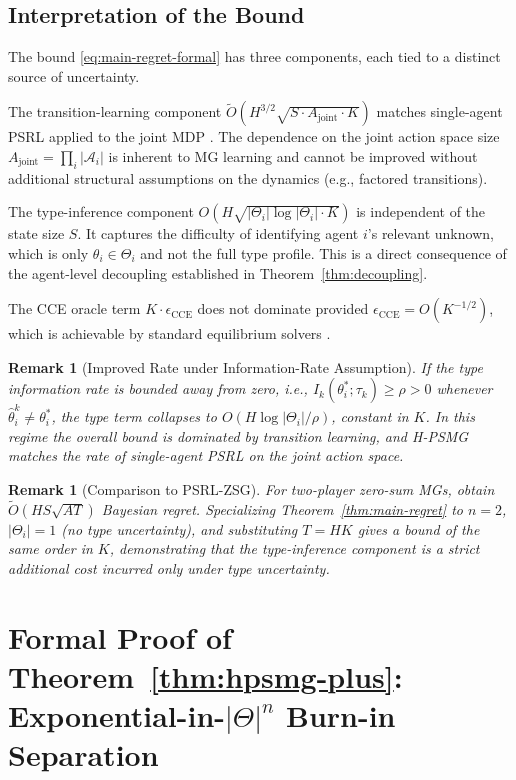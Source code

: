 \documentclass{article}
\newtheorem{remark}[theorem]{Remark}
\begin{document}
\subsection{Interpretation of the Bound}

The bound \eqref{eq:main-regret-formal} has three components, each tied to a distinct source of uncertainty.

The transition-learning component $\tilde{O}(H^{3/2}\sqrt{S \cdot A_{\mathrm{joint}} \cdot K})$ matches single-agent PSRL applied to the joint MDP \citep{osband2013more}. The dependence on the joint action space size $A_{\mathrm{joint}} = \prod_i |\mathcal{A}_i|$ is inherent to MG learning and cannot be improved without additional structural assumptions on the dynamics (e.g., factored transitions).

The type-inference component $O(H\sqrt{|\Theta_i| \log|\Theta_i| \cdot K})$ is independent of the state size $S$. It captures the difficulty of identifying agent $i$'s relevant unknown, which is only $\theta_i \in \Theta_i$ and not the full type profile. This is a direct consequence of the agent-level decoupling established in Theorem~\ref{thm:decoupling}.

The CCE oracle term $K \cdot \epsilon_{\mathrm{CCE}}$ does not dominate provided $\epsilon_{\mathrm{CCE}} = O(K^{-1/2})$, which is achievable by standard equilibrium solvers \citep{jin2021v}.

\begin{remark}[Improved Rate under Information-Rate Assumption]
If the type information rate is bounded away from zero, i.e., $I_k(\theta_i^*; \tau_k) \geq \rho > 0$ whenever $\hat{\theta}_i^k \neq \theta_i^*$, the type term collapses to $O(H \log|\Theta_i| / \rho)$, constant in $K$. In this regime the overall bound is dominated by transition learning, and H-PSMG matches the rate of single-agent PSRL on the joint action space.
\end{remark}

\begin{remark}[Comparison to PSRL-ZSG]
For two-player zero-sum MGs, \citet{jafarnia2021learning} obtain $\tilde{O}(HS\sqrt{AT})$ Bayesian regret. Specializing Theorem~\ref{thm:main-regret} to $n=2$, $|\Theta_i| = 1$ (no type uncertainty), and substituting $T = HK$ gives a bound of the same order in $K$, demonstrating that the type-inference component is a strict additional cost incurred only under type uncertainty.
\end{remark}

\section[Formal Proof of the Exponential-in-Theta-n Burn-in Separation Theorem]{Formal Proof of Theorem~\ref{thm:hpsmg-plus}: Exponential-in-\texorpdfstring{$|\Theta|^n$}{|Theta|\^n} Burn-in Separation}
\label{app:hpsmg-plus}
\end{document}
